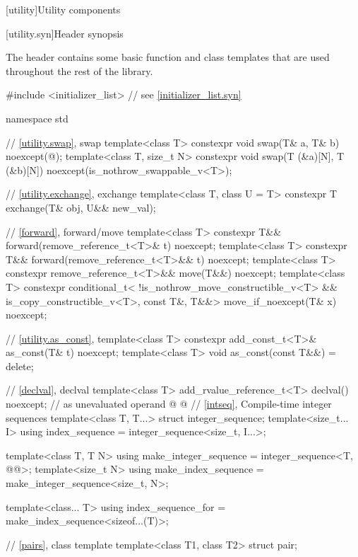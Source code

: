 [utility]{Utility components}

%
%
[utility.syn]{Header  synopsis}

\pnum
The header 
contains some basic function and class templates that are used
throughout the rest of the library.

\begin{codeblock}
#include <initializer_list>     // see \ref{initializer_list.syn}

namespace std {
  // \ref{utility.swap}, swap
  template<class T>
    constexpr void swap(T& a, T& b) noexcept(@\seebelow@);
  template<class T, size_t N>
    constexpr void swap(T (&a)[N], T (&b)[N]) noexcept(is_nothrow_swappable_v<T>);

  // \ref{utility.exchange}, exchange
  template<class T, class U = T>
    constexpr T exchange(T& obj, U&& new_val);

  // \ref{forward}, forward/move
  template<class T>
    constexpr T&& forward(remove_reference_t<T>& t) noexcept;
  template<class T>
    constexpr T&& forward(remove_reference_t<T>&& t) noexcept;
  template<class T>
    constexpr remove_reference_t<T>&& move(T&&) noexcept;
  template<class T>
    constexpr conditional_t<
        !is_nothrow_move_constructible_v<T> && is_copy_constructible_v<T>, const T&, T&&>
      move_if_noexcept(T& x) noexcept;

  // \ref{utility.as_const}, 
  template<class T>
    constexpr add_const_t<T>& as_const(T& t) noexcept;
  template<class T>
    void as_const(const T&&) = delete;

  // \ref{declval}, declval
  template<class T>
    add_rvalue_reference_t<T> declval() noexcept;  // as unevaluated operand
@%
%
%
%
@
  // \ref{intseq}, Compile-time integer sequences
  template<class T, T...>
    struct integer_sequence;
  template<size_t... I>
    using index_sequence = integer_sequence<size_t, I...>;

  template<class T, T N>
    using make_integer_sequence = integer_sequence<T, @\seebelow{}@>;
  template<size_t N>
    using make_index_sequence = make_integer_sequence<size_t, N>;

  template<class... T>
    using index_sequence_for = make_index_sequence<sizeof...(T)>;

  // \ref{pairs}, class template 
  template<class T1, class T2>
    struct pair;

}
\end{codeblock}
